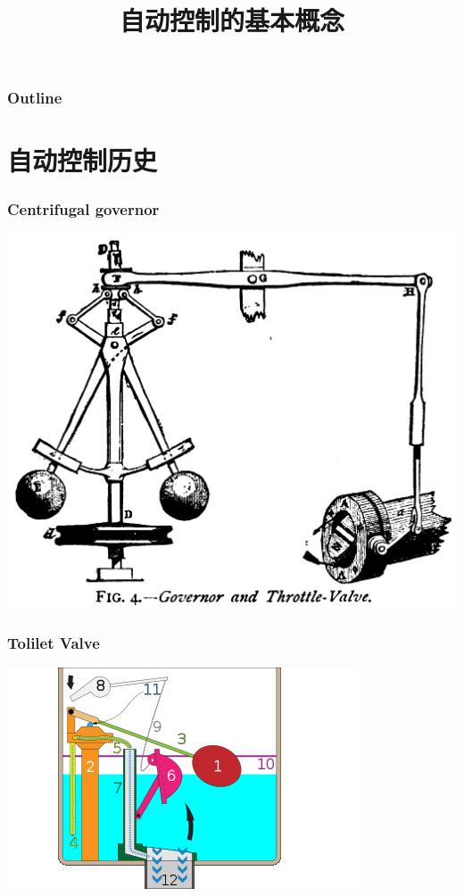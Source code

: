 \documentclass{beamer}
\title{自动控制的基本概念}
\author{}
\date{}
\begin{document}
\maketitle

\begin{frame}
\frametitle{Outline}
\setcounter{tocdepth}{3}
\tableofcontents
\end{frame}













\section{自动控制历史}
\label{sec-1}
\begin{frame}
\frametitle{Centrifugal governor}
\label{sec-1-1}

\includegraphics[width=\textwidth]{image/centrifugal_governor.png}
\end{frame}
\begin{frame}
\frametitle{Tolilet Valve}
\label{sec-1-2}

\includegraphics[width=\textwidth]{image/250px-Gravity_toilet_valves_handle_down.svg.png}
\end{frame}
\end{document}

